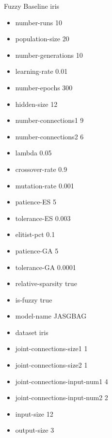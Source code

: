 Fuzzy Baseline
iris
\begin{itemize}
\item number-runs 10
\item population-size 20
\item number-generations 10
\item learning-rate 0.01
\item number-epochs 300
\item hidden-size 12
\item number-connections1 9
\item number-connections2 6
\item lambda 0.05
\item crossover-rate 0.9
\item mutation-rate 0.001
\item patience-ES 5
\item tolerance-ES 0.003
\item elitist-pct 0.1
\item patience-GA 5
\item tolerance-GA 0.0001
\item relative-sparsity true
\item is-fuzzy true
\item model-name JASGBAG
\item dataset iris
\item joint-connections-size1 1
\item joint-connections-size2 1
\item joint-connections-input-num1 4
\item joint-connections-input-num2 2
\item input-size 12
\item output-size 3
\end{itemize}

